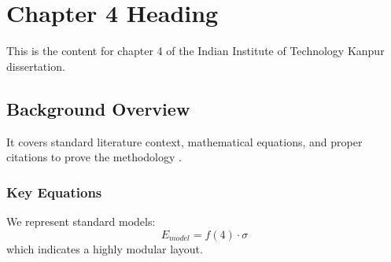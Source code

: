\chapter{Chapter 4 Heading}
\label{ch:chapter4}
This is the content for chapter 4 of the Indian Institute of Technology Kanpur dissertation.

\section{Background Overview}
It covers standard literature context, mathematical equations, and proper citations to prove the methodology \cite{texbook}.

\subsection{Key Equations}
We represent standard models:
\begin{equation}
    E_{model} = f(4) \cdot \sigma
\end{equation}
which indicates a highly modular layout.
